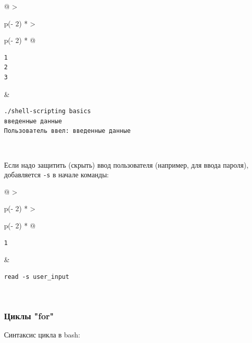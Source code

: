 \documentclass{report}
\begin{document}
\begin{longtable}[]{@{}
  >{\raggedright\arraybackslash}p{(\columnwidth - 2\tabcolsep) * }
  >{\raggedright\arraybackslash}p{(\columnwidth - 2\tabcolsep) * }@{}}
\toprule
\endhead
\begin{minipage}[t]{\linewidth}\raggedright
\begin{verbatim}
1
2
3
\end{verbatim}
\end{minipage} & \begin{minipage}[t]{\linewidth}\raggedright
\begin{verbatim}
./shell-scripting basics
введенные данные
Пользователь ввел: введенные данные
\end{verbatim}
\end{minipage} \\ \addlinespace
\bottomrule
\end{longtable}

Если надо защитить (скрыть) ввод пользователя (например, для ввода
пароля), добавляется \texttt{-s} в начале команды:

\begin{longtable}[]{@{}
  >{\raggedright\arraybackslash}p{(\columnwidth - 2\tabcolsep) * }
  >{\raggedright\arraybackslash}p{(\columnwidth - 2\tabcolsep) * }@{}}
\toprule
\endhead
\begin{minipage}[t]{\linewidth}\raggedright
\begin{verbatim}
1
\end{verbatim}
\end{minipage} & \begin{minipage}[t]{\linewidth}\raggedright
\begin{verbatim}
read -s user_input
\end{verbatim}
\end{minipage} \\ \addlinespace
\bottomrule
\end{longtable}

\hypertarget{for-loops}{%
\subsubsection{\texorpdfstring{\protect\hyperlink{for-loops}{}Циклы
"for"}{Циклы "for"}}\label{for-loops}}

Синтаксис цикла в bash:
\end{document}
